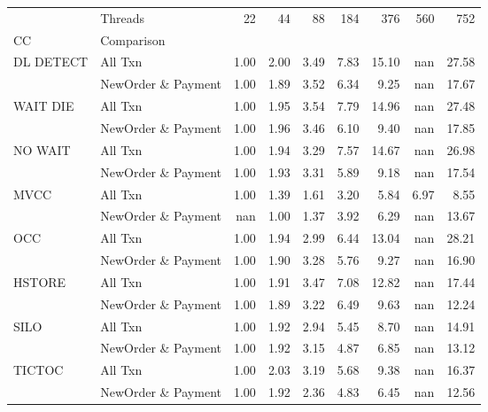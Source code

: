 \begin{tabular}{llrrrrrrr}
\toprule
       & Threads &  22  &  44  &  88  &  184 &   376 &  560 &   752 \\
CC & Comparison &      &      &      &      &       &      &       \\
\midrule
DL DETECT & All Txn & 1.00 & 2.00 & 3.49 & 7.83 & 15.10 &  nan & 27.58 \\
       & NewOrder \& Payment & 1.00 & 1.89 & 3.52 & 6.34 &  9.25 &  nan & 17.67 \\
WAIT DIE & All Txn & 1.00 & 1.95 & 3.54 & 7.79 & 14.96 &  nan & 27.48 \\
       & NewOrder \& Payment & 1.00 & 1.96 & 3.46 & 6.10 &  9.40 &  nan & 17.85 \\
NO WAIT & All Txn & 1.00 & 1.94 & 3.29 & 7.57 & 14.67 &  nan & 26.98 \\
       & NewOrder \& Payment & 1.00 & 1.93 & 3.31 & 5.89 &  9.18 &  nan & 17.54 \\
MVCC & All Txn & 1.00 & 1.39 & 1.61 & 3.20 &  5.84 & 6.97 &  8.55 \\
       & NewOrder \& Payment &  nan & 1.00 & 1.37 & 3.92 &  6.29 &  nan & 13.67 \\
OCC & All Txn & 1.00 & 1.94 & 2.99 & 6.44 & 13.04 &  nan & 28.21 \\
       & NewOrder \& Payment & 1.00 & 1.90 & 3.28 & 5.76 &  9.27 &  nan & 16.90 \\
HSTORE & All Txn & 1.00 & 1.91 & 3.47 & 7.08 & 12.82 &  nan & 17.44 \\
       & NewOrder \& Payment & 1.00 & 1.89 & 3.22 & 6.49 &  9.63 &  nan & 12.24 \\
SILO & All Txn & 1.00 & 1.92 & 2.94 & 5.45 &  8.70 &  nan & 14.91 \\
       & NewOrder \& Payment & 1.00 & 1.92 & 3.15 & 4.87 &  6.85 &  nan & 13.12 \\
TICTOC & All Txn & 1.00 & 2.03 & 3.19 & 5.68 &  9.38 &  nan & 16.37 \\
       & NewOrder \& Payment & 1.00 & 1.92 & 2.36 & 4.83 &  6.45 &  nan & 12.56 \\
\bottomrule
\end{tabular}
